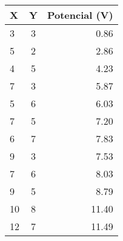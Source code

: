 \begin{tabular}{| l | c | r |}
\hline
X	&Y	&Potencial (V)\\ \hline
3 	&3 	&0.86\\
5 	&2	&2.86\\
4 	&5 	&4.23\\
7 	&3 	&5.87\\
5 	&6 	&6.03\\
7 	&5 	&7.20\\
6 	&7	&7.83\\
9 	&3	&7.53\\
7 	&6 	&8.03\\
9 	&5	&8.79\\
10 	&8	&11.40\\
12 	&7	&11.49\\ \hline
\end{tabular}